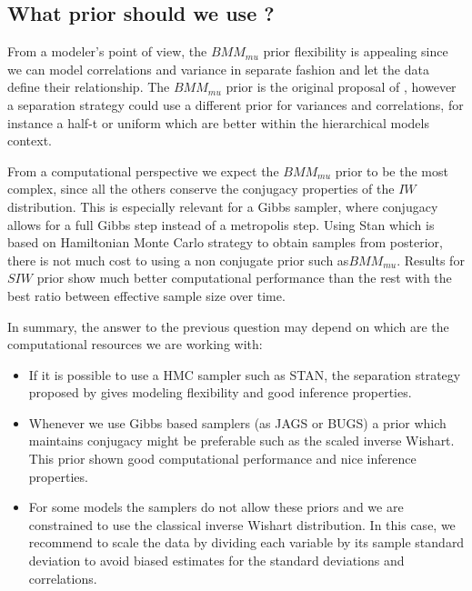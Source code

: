 \documentclass[a4paper]{article}
\begin{document}
 \subsection{What prior should we use ?} 

From a modeler's point of view, the $BMM_{mu}$ prior flexibility is appealing since we can model correlations and variance in separate fashion and let the data define their relationship.  The $BMM_{mu}$ prior is the original proposal of \cite{barnard2000}, however a separation strategy could use a different prior for variances and correlations, for instance a half-t or uniform which are better within the hierarchical models context. 

From a computational perspective we expect the $BMM_{mu}$ prior to be the most complex, since all the others conserve the conjugacy properties of the $IW$ distribution. This is especially relevant for a Gibbs sampler, where conjugacy allows for a full Gibbs step instead of a metropolis step. Using Stan which is based on Hamiltonian Monte Carlo strategy to obtain samples from posterior, there is not much cost to using a non conjugate prior such as$BMM_{mu}$.  Results for $SIW$ prior show much better computational performance than the rest with the best ratio between effective sample size over time.  

In summary, the answer to the previous question may depend on which are the computational resources we are working with:
\begin{itemize}
\item  If it is possible to use a HMC sampler such as STAN, the separation strategy proposed by \cite{barnard2000} gives modeling flexibility and good inference properties. 
\item Whenever we use Gibbs based samplers (as JAGS or BUGS) a prior which maintains conjugacy might be preferable such as the scaled inverse Wishart. This prior shown good computational performance and nice inference properties.  
\item For some models the samplers do not allow these priors and we are constrained to use the classical inverse Wishart distribution. In this case, we recommend to scale the data by dividing each variable by its sample standard deviation to avoid biased estimates for the standard deviations and correlations. 
\end{itemize}
\end{document}
